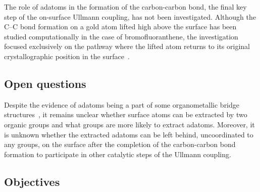 \documentclass[%
 reprint,
 amsmath,amssymb,
 aps,
prb,
floatfix,
]{revtex4-2}
\newcommand{\lock}{\color{red}}
\newcommand{\lock}{\color{red}}
\begin{document}

{\lock

The role of adatoms in the formation of the carbon-carbon bond, the final key step of the on-surface Ullmann coupling, has not been investigated. Although the C--C bond formation on a gold atom lifted high above the surface has been studied computationally in the case of bromofluoranthene,
the investigation focused exclusively on the pathway where the lifted atom returns to its original crystallographic position in the surface~\cite{jpcc2018}. 

}

\ifdefined\INTERNAL

\subsection{Open questions}

\fi
{\lock

Despite the evidence of adatoms being a part of some organometallic bridge structures~\cite{acsnano2017, acsnano2019}, it remains unclear whether surface atoms can be extracted by two organic groups and what groups are more likely to extract adatoms. Moreover, it is unknown whether the extracted adatoms can be left behind, uncoordinated to any groups, on the surface after the completion of the carbon-carbon bond formation to participate in other catalytic steps of the Ullmann coupling.


}

\ifdefined\INTERNAL

\subsection{Objectives}
\end{document}
